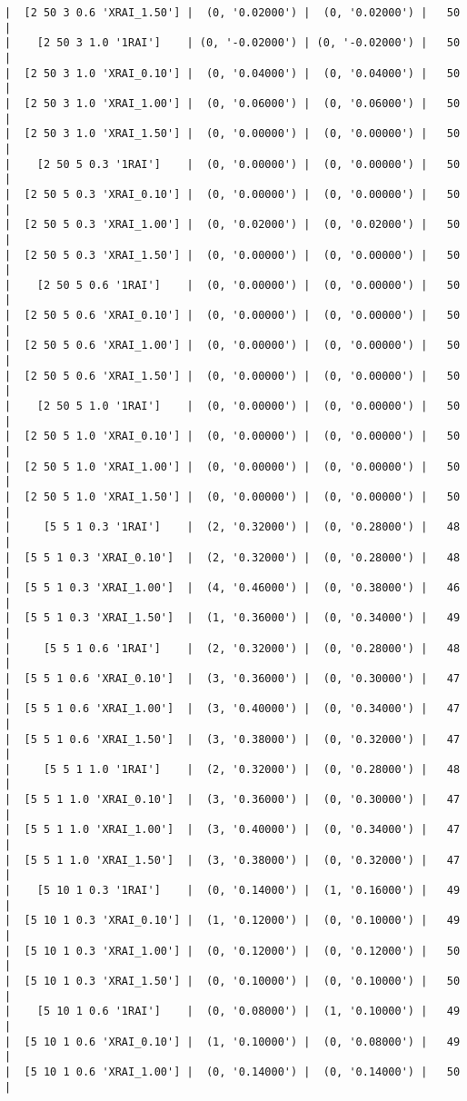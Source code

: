 \documentclass{article}
\begin{document}
\begin{verbatim}
|  [2 50 3 0.6 'XRAI_1.50'] |  (0, '0.02000') |  (0, '0.02000') |   50  |
|    [2 50 3 1.0 '1RAI']    | (0, '-0.02000') | (0, '-0.02000') |   50  |
|  [2 50 3 1.0 'XRAI_0.10'] |  (0, '0.04000') |  (0, '0.04000') |   50  |
|  [2 50 3 1.0 'XRAI_1.00'] |  (0, '0.06000') |  (0, '0.06000') |   50  |
|  [2 50 3 1.0 'XRAI_1.50'] |  (0, '0.00000') |  (0, '0.00000') |   50  |
|    [2 50 5 0.3 '1RAI']    |  (0, '0.00000') |  (0, '0.00000') |   50  |
|  [2 50 5 0.3 'XRAI_0.10'] |  (0, '0.00000') |  (0, '0.00000') |   50  |
|  [2 50 5 0.3 'XRAI_1.00'] |  (0, '0.02000') |  (0, '0.02000') |   50  |
|  [2 50 5 0.3 'XRAI_1.50'] |  (0, '0.00000') |  (0, '0.00000') |   50  |
|    [2 50 5 0.6 '1RAI']    |  (0, '0.00000') |  (0, '0.00000') |   50  |
|  [2 50 5 0.6 'XRAI_0.10'] |  (0, '0.00000') |  (0, '0.00000') |   50  |
|  [2 50 5 0.6 'XRAI_1.00'] |  (0, '0.00000') |  (0, '0.00000') |   50  |
|  [2 50 5 0.6 'XRAI_1.50'] |  (0, '0.00000') |  (0, '0.00000') |   50  |
|    [2 50 5 1.0 '1RAI']    |  (0, '0.00000') |  (0, '0.00000') |   50  |
|  [2 50 5 1.0 'XRAI_0.10'] |  (0, '0.00000') |  (0, '0.00000') |   50  |
|  [2 50 5 1.0 'XRAI_1.00'] |  (0, '0.00000') |  (0, '0.00000') |   50  |
|  [2 50 5 1.0 'XRAI_1.50'] |  (0, '0.00000') |  (0, '0.00000') |   50  |
|     [5 5 1 0.3 '1RAI']    |  (2, '0.32000') |  (0, '0.28000') |   48  |
|  [5 5 1 0.3 'XRAI_0.10']  |  (2, '0.32000') |  (0, '0.28000') |   48  |
|  [5 5 1 0.3 'XRAI_1.00']  |  (4, '0.46000') |  (0, '0.38000') |   46  |
|  [5 5 1 0.3 'XRAI_1.50']  |  (1, '0.36000') |  (0, '0.34000') |   49  |
|     [5 5 1 0.6 '1RAI']    |  (2, '0.32000') |  (0, '0.28000') |   48  |
|  [5 5 1 0.6 'XRAI_0.10']  |  (3, '0.36000') |  (0, '0.30000') |   47  |
|  [5 5 1 0.6 'XRAI_1.00']  |  (3, '0.40000') |  (0, '0.34000') |   47  |
|  [5 5 1 0.6 'XRAI_1.50']  |  (3, '0.38000') |  (0, '0.32000') |   47  |
|     [5 5 1 1.0 '1RAI']    |  (2, '0.32000') |  (0, '0.28000') |   48  |
|  [5 5 1 1.0 'XRAI_0.10']  |  (3, '0.36000') |  (0, '0.30000') |   47  |
|  [5 5 1 1.0 'XRAI_1.00']  |  (3, '0.40000') |  (0, '0.34000') |   47  |
|  [5 5 1 1.0 'XRAI_1.50']  |  (3, '0.38000') |  (0, '0.32000') |   47  |
|    [5 10 1 0.3 '1RAI']    |  (0, '0.14000') |  (1, '0.16000') |   49  |
|  [5 10 1 0.3 'XRAI_0.10'] |  (1, '0.12000') |  (0, '0.10000') |   49  |
|  [5 10 1 0.3 'XRAI_1.00'] |  (0, '0.12000') |  (0, '0.12000') |   50  |
|  [5 10 1 0.3 'XRAI_1.50'] |  (0, '0.10000') |  (0, '0.10000') |   50  |
|    [5 10 1 0.6 '1RAI']    |  (0, '0.08000') |  (1, '0.10000') |   49  |
|  [5 10 1 0.6 'XRAI_0.10'] |  (1, '0.10000') |  (0, '0.08000') |   49  |
|  [5 10 1 0.6 'XRAI_1.00'] |  (0, '0.14000') |  (0, '0.14000') |   50  |

\end{verbatim}
\end{document}
